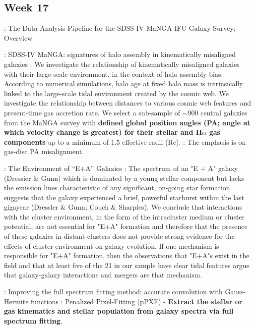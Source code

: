 \documentclass[ceqn,usenatbib,onecolumn]{mnras}
\begin{document}
\subsection{Week 17}
\par \citet{2019arXiv190100856W} : {The Data Analysis Pipeline for the SDSS-IV MaNGA IFU Galaxy Survey: Overview}
\par \citet{2019MNRAS.483..172D} : {SDSS-IV MaNGA: signatures of halo assembly in kinematically misaligned galaxies} : We investigate the relationship of kinematically misaligned galaxies with their large-scale environment, in the context of halo assembly bias. According to numerical simulations, halo age at fixed halo mass is intrinsically linked to the large-scale tidal environment created by the cosmic web. We investigate the relationship between distances to various cosmic web features and present-time gas accretion rate. We select a sub-sample of $\sim$900 central galaxies from the MaNGA survey with \textbf{defined global position angles (PA; angle at which velocity change is greatest) for their stellar and H$\alpha$ gas components} up to a minimum of 1.5 effective radii (Re). : The emphasis is on gas-disc PA misalignment.
\par \citet{1996ApJ...466..104Z} : {The Environment of ``E+A'' Galaxies} : The spectrum of an "E + A" galaxy (Dressier \& Gunn) which is dominated by a young stellar component but lacks the emission lines characteristic of any significant, on-going star formation suggests that the galaxy experienced a brief, powerful starburst within the last gigayear (Dressler \& Gunn; Couch \& Sharples). We conclude that interactions with the cluster environment, in the form of the intracluster medium or cluster potential, are not essential for "E+A" formation and therefore that the presence of these galaxies in distant clusters does not provide strong evidence for the effects of cluster environment on galaxy evolution. If one mechanism is responsible for "E+A" formation, then the observations that "E+A"s exist in the field and that at least five of the 21 in our sample have clear tidal features argue that galaxy-galaxy interactions and mergers are that mechanism. 
\par \citet{2017MNRAS.466..798C} : {Improving the full spectrum fitting method: accurate convolution with Gauss-Hermite functions} : Penalized Pixel-Fitting (pPXF) - \textbf{Extract the stellar or gas kinematics and stellar population from galaxy spectra via full spectrum fitting}.
\end{document}

